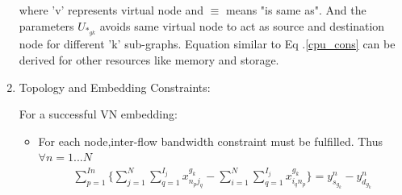 \documentclass[article,dr=phil,type=msc ,colorback,accentcolor=tud4b]{tudthesis}
\begin{document}
\begin{enumerate}[label=(\Alph*)]
where 'v' represents virtual node and $\equiv$ means "is same as". And the parameters $U_{*_{gk}}$ avoids same virtual node to act as source and destination node for different 'k' sub-graphs. Equation similar to Eq .\ref{cpu_cons} can be derived for other resources like memory and storage.  
\item Topology and Embedding Constraints: 

For a successful VN embedding: 
\begin{itemize} 	
\item For each node,inter-flow bandwidth constraint must be fulfilled. Thus $\forall n = 1...N $
\begin{equation} \label{tec}
\begin{split}
\sum_{p=1}^{I{n}} \bigg\{ \sum_{j=1}^{N} \sum_{q=1}^{I_{j}} x^{g_{k}}_{n_{p}j_{q}} - \sum_{i=1}^{N} \sum_{q=1}^{I_{j}} x^{g_{k}}_{i_{q}n_{p}}\bigg\} = y_{s_{g_{k}}}^{n} - y_{d_{g_{k}}}^{n} 
\end{split}
\end{equation} 
	

\end{itemize}
\end{enumerate}
\end{document}
